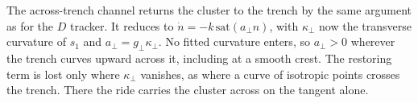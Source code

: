 The across-trench channel returns the cluster to the trench by the same
argument as for the $D$ tracker. It reduces to
$\dot{n} = -k\,\mathrm{sat}(a_\perp n)$, with $\kappa_\perp$ now the
transverse curvature of $s_1$ and $a_\perp = g_\perp\kappa_\perp$. No
fitted curvature enters, so $a_\perp > 0$ wherever the trench curves
upward across it, including at a smooth crest. The restoring term is lost
only where $\kappa_\perp$ vanishes, as where a curve of isotropic points
crosses the trench. There the ride carries the cluster across on the
tangent alone.
